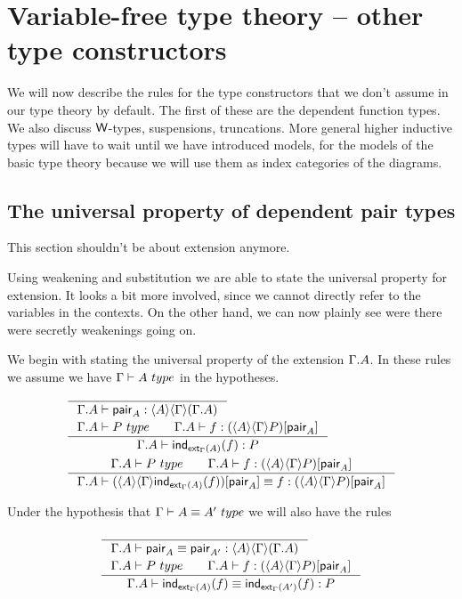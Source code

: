 \section{Variable-free type theory -- other type constructors}
We will now describe the rules for the type constructors that we don't assume
in our type theory by default. The first of these are the dependent function
types. We also discuss $\mathsf{W}$-types, suspensions, truncations. More general higher inductive
types will have to wait until we have introduced models, for the models of the
basic type theory because we will use them as index categories of the diagrams.

\subsection{The universal property of dependent pair types}
This section shouldn't be about extension anymore.

Using weakening and substitution we are able to state the universal property
for extension. It looks a bit more involved, since we cannot directly refer
to the variables in the contexts. On the other hand, we can now plainly see
were there were secretly weakenings going on.

We begin with stating the universal property of the extension $\ctxext{\Gamma}{A}$.
In these rules we assume we have $\jtype{\Gamma}{A}$ in the hypotheses.
\begin{align}
& \inference{}
{\jterm{\ctxext{\Gamma}{A}}{\ctxwk{A}{{\Gamma}{\ctxext{\Gamma}{A}}}}{\pair_A}}\\
& \inference{
  \jtype{\ctxext{\Gamma}{A}}{P}
  \qquad
  \jterm{\ctxext{\Gamma}{A}}{\subst{\pair_A}{\ctxwk{A}{{\Gamma}{P}}}}{f}}
  {\jterm{\ctxext{\Gamma}{A}}{P}{\ind{\tfext_\Gamma(A)}(f)}}\\
& \inference{
  \jtype{\ctxext{\Gamma}{A}}{P}
  \qquad
  \jterm{\ctxext{\Gamma}{A}}{\subst{\pair_A}{\ctxwk{A}{{\Gamma}{P}}}}{f}}
  {\jtermeq{\ctxext{\Gamma}{A}}{\subst{\pair_A}{\ctxwk{A}{{\Gamma}{P}}}}{\subst{\pair_A}{\ctxwk{A}{{\Gamma}{\ind{\tfext_\Gamma(A)}(f)}}}}{f}}
\end{align}

Under the hypothesis that $\jtypeeq{\Gamma}{A}{A'}$
we will also have the rules

\begin{align}
& \inference{}{\jtermeq{\ctxext{\Gamma}{A}}{\ctxwk{A}{{\Gamma}{\ctxext{\Gamma}{A}}}}{\pair_A}{\pair_{A'}}}\\
& \inference{\jtype{\ctxext{\Gamma}{A}}{P}\qquad\jterm{\ctxext{\Gamma}{A}}{\subst{\pair_A}{\ctxwk{A}{{\Gamma}{P}}}}{f}}
{\jtermeq{\ctxext{\Gamma}{A}}{P}{\ind{\tfext_\Gamma(A)}(f)}{\ind{\tfext_\Gamma(A')}(f)}}
\end{align}

